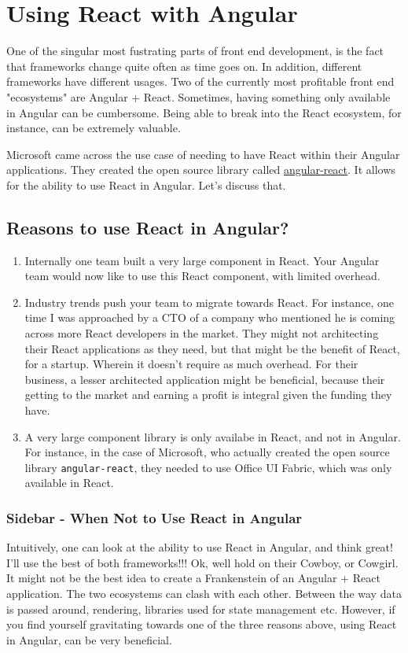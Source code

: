 \chapter{ Using React with Angular }

One of the singular most fustrating parts of front end development, is the fact
that frameworks change quite often as time goes on. In addition, different frameworks have different usages. Two of the currently most profitable front end "ecosystems" are Angular + React. Sometimes, having something only available in Angular can be cumbersome. Being able to break into the React ecosystem, for instance, can be extremely valuable. 

Microsoft came across the use case of needing to have React within their Angular applications. They created the open source library called \href{github.com/microsoft/angular-react}{angular-react}. It allows for the ability to use React in Angular. Let's discuss that.

\section{ Reasons to use React in Angular? }

\begin{enumerate}
  \item Internally one team built a very large component in React. Your Angular team would now like to use this React component, with limited overhead.  
  \item Industry trends push your team to migrate towards React. For instance, one time I was approached by a CTO of a company who mentioned he is coming across more React developers in the market. They might not architecting their React applications as they need, but that might be the benefit of React, for a startup. Wherein it doesn't require as much overhead. For their business, a lesser architected application might be beneficial, because their getting to the market and earning a profit is integral given the funding they have. 
  \item A very large component library is only availabe in React, and not in Angular. For instance, in the case of Microsoft, who actually created the open source library \lstinline{angular-react}, they needed to use Office UI Fabric, which was only available in React. 
\end{enumerate}

\subsection{Sidebar - When Not to Use React in Angular}
Intuitively, one can look at the ability to use React in Angular, and think great! I'll use the best of both frameworks!!! Ok, well hold on their Cowboy, or Cowgirl. It might not be the best idea to create a Frankenstein of an Angular + React application. The two ecosystems can clash with each other. Between the way data is passed around, rendering, libraries used for state management etc. However, if you find yourself gravitating towards one of the three reasons above, using React in Angular, can be very beneficial.

